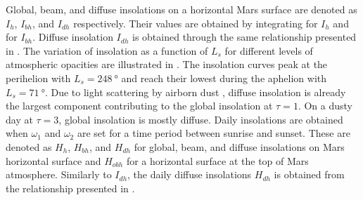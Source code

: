 Global, beam, and diffuse insolations on a horizontal Mars surface are denoted as $I_{h}$, $I_{bh}$, and $I_{dh}$ respectively. Their values are obtained by integrating  for $I_{h}$ and  for $I_{bh}$. Diffuse insolation $I_{dh}$ is obtained through the same relationship presented in . The variation of insolation as a function of $L_{s}$ for different levels of atmospheric opacities are illustrated in . The insolation curves peak at the perihelion with $L_{s} = \SI{248}{\degree}$ and reach their lowest during the aphelion with $L_{s} = \SI{71}{\degree}$. Due to light scattering by airborn dust , diffuse insolation is already the largest component contributing to the global insolation at $\tau = 1$. On a dusty day at $\tau = 3$, global insolation is mostly diffuse. Daily insolations are obtained when $\omega_1$ and $\omega_2$ are set for a time period between sunrise and sunset. These are denoted as $H_{h}$, $H_{bh}$, and $H_{dh}$ for global, beam, and diffuse insolations on Mars horizontal surface and $H_{obh}$ for a horizontal surface at the top of Mars atmosphere. Similarly to $I_{dh}$, the daily diffuse insolations $H_{dh}$ is obtained from the relationship presented in .


